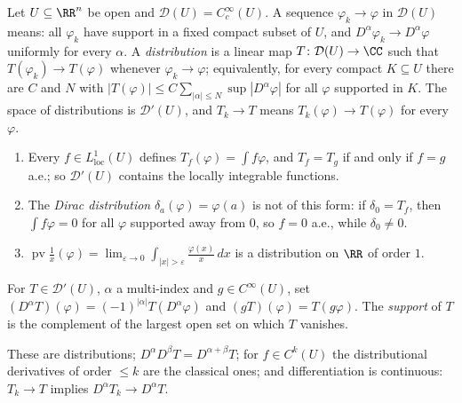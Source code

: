 \begin{definition}\label{distributions:definition-distribution}
Let $U \subseteq \RR^n$ be open and $\mathcal{D}(U) = C_c^\infty(U)$. A sequence $\varphi_k \to \varphi$ in $\mathcal{D}(U)$ means: all $\varphi_k$ have support in a fixed compact subset of $U$, and
$D^\alpha\varphi_k \to D^\alpha\varphi$ uniformly for every $\alpha$. A \emph{distribution} is a linear map $T \colon \mathcal{D}(U) \to \CC$ such that $T(\varphi_k) \to T(\varphi)$ whenever
$\varphi_k \to \varphi$; equivalently, for every compact $K \subseteq U$ there are $C$ and $N$ with $|T(\varphi)| \leq C\sum_{|\alpha| \leq N}\sup|D^\alpha\varphi|$ for all $\varphi$ supported in $K$. The space of
distributions is $\mathcal{D}'(U)$, and $T_k \to T$ means $T_k(\varphi) \to T(\varphi)$ for every $\varphi$.
\end{definition}

\begin{example}\label{distributions:example-distributions}
\begin{enumerate}
\item Every $f \in L^1_{\mathrm{loc}}(U)$ defines $T_f(\varphi) = \int f\varphi$, and $T_f = T_g$ if and only if $f = g$ a.e.; so $\mathcal{D}'(U)$ contains the locally integrable functions.
\item The \emph{Dirac distribution} $\delta_a(\varphi) = \varphi(a)$ is not of this form: if $\delta_0 = T_f$, then $\int f\varphi = 0$ for all $\varphi$ supported away from $0$, so $f = 0$ a.e., while
$\delta_0 \neq 0$.
\item $\operatorname{pv}\frac1x(\varphi) = \lim_{\varepsilon \to 0}\int_{|x| > \varepsilon}\frac{\varphi(x)}{x}\,dx$ is a distribution on $\RR$ of order $1$.
\end{enumerate}
\end{example}

\begin{definition}\label{distributions:definition-derivative}
For $T \in \mathcal{D}'(U)$, $\alpha$ a multi-index and $g \in C^\infty(U)$, set $(D^\alpha T)(\varphi) = (-1)^{|\alpha|}T(D^\alpha\varphi)$ and $(gT)(\varphi) = T(g\varphi)$. The \emph{support} of $T$ is the
complement of the largest open set on which $T$ vanishes.
\end{definition}

\begin{proposition}\label{distributions:proposition-derivative}
These are distributions; $D^\alpha D^\beta T = D^{\alpha+\beta}T$; for $f \in C^k(U)$ the distributional derivatives of order $\leq k$ are the classical ones; and differentiation is continuous: $T_k \to T$
implies $D^\alpha T_k \to D^\alpha T$.
\end{proposition}

